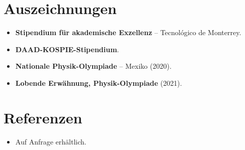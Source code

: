 \documentclass[11pt,a4paper,sans]{moderncv}
\begin{document}

\section{Auszeichnungen}
\vspace{1pt}
\begin{itemize}
\item{\textbf{Stipendium für akademische Exzellenz} -- Tecnológico de Monterrey.}
\item{\textbf{DAAD-KOSPIE-Stipendium}.}
\item{\textbf{Nationale Physik-Olympiade} -- Mexiko (2020).}
\item{\textbf{Lobende Erwähnung, Physik-Olympiade} (2021).}
\end{itemize}


\section{Referenzen}
\vspace{1pt}
\begin{itemize}
\item{Auf Anfrage erhältlich.}
\end{itemize}
\end{document}
